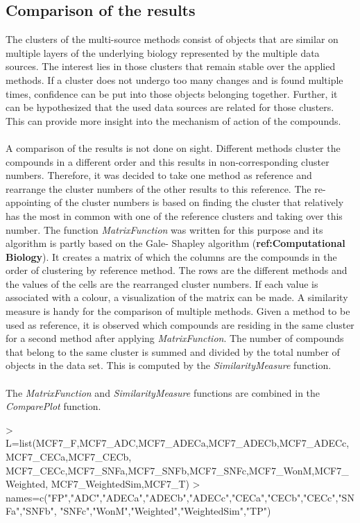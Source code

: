 \documentclass[a4paper]{article}
\begin{document}
\subsection{Comparison of the results}
The clusters of the multi-source methods consist of objects that
are similar on multiple layers of the underlying biology represented by the
multiple data sources. The interest lies in those clusters that remain stable over
the applied methods. If a cluster does not undergo too many changes and is found
multiple times, confidence can be put into those objects belonging together.
Further, it can be hypothesized that the used data sources are related for those
clusters. This can provide more insight into the mechanism of action of the
compounds.\\ \\
A comparison of the results is not done on sight. Different methods cluster the
compounds in a different order and this results in non-corresponding cluster
numbers. Therefore, it was decided to take one method as reference and rearrange
the cluster numbers of the other results to this reference. The re-appointing of
the cluster numbers is based on finding the cluster that relatively has the most
in common with one of the reference clusters and taking over this number. The
function {\it MatrixFunction} was written for this purpose and its algorithm is
partly based on the Gale- Shapley algorithm ({\bf ref:Computational Biology}).
It creates a matrix of which the columns are the compounds in the order of
clustering by reference method. The rows are the different methods and the
values of the cells are the rearranged cluster numbers. If each value is
associated with a colour, a visualization of the matrix can be made. A
similarity measure is handy for the comparison of multiple methods. Given a
method to be used as reference, it is observed which compounds are residing in
the same cluster for a second method after applying {\it MatrixFunction}. The
number of compounds that belong to the same cluster is summed and divided by the
total number of objects in the data set. This is computed by the {\it
SimilarityMeasure} function.\\ \\
The {\it MatrixFunction} and {\it SimilarityMeasure} functions are combined in
the {\it ComparePlot} function. 
\begin{Schunk}
\begin{Sinput}
> L=list(MCF7_F,MCF7_ADC,MCF7_ADECa,MCF7_ADECb,MCF7_ADECc,MCF7_CECa,MCF7_CECb,
        MCF7_CECc,MCF7_SNFa,MCF7_SNFb,MCF7_SNFc,MCF7_WonM,MCF7_Weighted,
        MCF7_WeightedSim,MCF7_T)
> names=c("FP","ADC","ADECa","ADECb","ADECc","CECa","CECb","CECc","SNFa","SNFb",
         "SNFc","WonM","Weighted","WeightedSim","TP")
\end{Sinput}
\end{Schunk}
\end{document}
